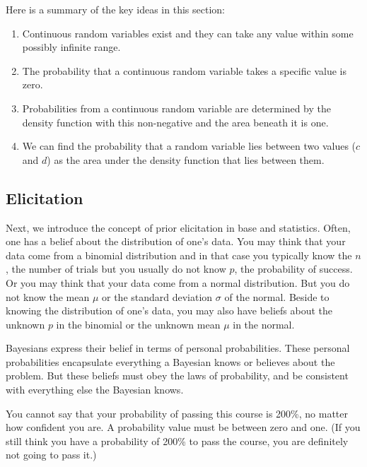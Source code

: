 \documentclass[]{book}
\theoremstyle{definition}
\theoremstyle{definition}
\theoremstyle{remark}
\let\BeginKnitrBlock\begin \let\EndKnitrBlock\end
\begin{document}
Here is a summary of the key ideas in this section:

\begin{enumerate}
\def\labelenumi{\arabic{enumi}.}
\item
  Continuous random variables exist and they can take any value within
  some possibly infinite range.
\item
  The probability that a continuous random variable takes a specific
  value is zero.
\item
  Probabilities from a continuous random variable are determined by the
  density function with this non-negative and the area beneath it is
  one.
\item
  We can find the probability that a random variable lies between two
  values (\(c\) and \(d\)) as the area under the density function that
  lies between them.
\end{enumerate}

\subsection{Elicitation}\label{elicitation}

Next, we introduce the concept of prior elicitation in base and
statistics. Often, one has a belief about the distribution of one's
data. You may think that your data come from a binomial distribution and
in that case you typically know the \(n\), the number of trials but you
usually do not know \(p\), the probability of success. Or you may think
that your data come from a normal distribution. But you do not know the
mean \(\mu\) or the standard deviation \(\sigma\) of the normal. Beside
to knowing the distribution of one's data, you may also have beliefs
about the unknown \(p\) in the binomial or the unknown mean \(\mu\) in
the normal.

Bayesians express their belief in terms of personal probabilities. These
personal probabilities encapsulate everything a Bayesian knows or
believes about the problem. But these beliefs must obey the laws of
probability, and be consistent with everything else the Bayesian knows.

\BeginKnitrBlock{example}
\protect\hypertarget{ex:unnamed-chunk-1}{}{\label{ex:unnamed-chunk-1}}You
cannot say that your probability of passing this course is 200\%, no
matter how confident you are. A probability value must be between zero
and one. (If you still think you have a probability of 200\% to pass the
course, you are definitely not going to pass it.)
\EndKnitrBlock{example}
\end{document}
